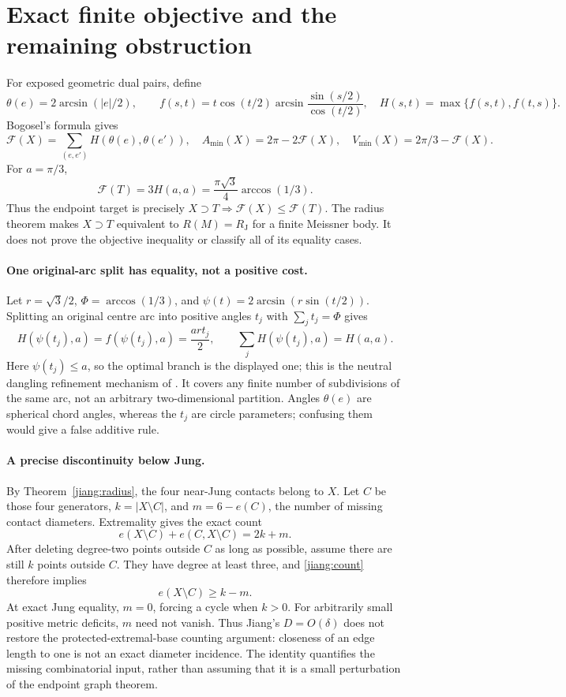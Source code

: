 \documentclass[11pt]{article}
\theoremstyle{remark}\newtheorem{remark}[theorem]{Remark}
\newcommand{\RJ}{R_{\mathrm J}}
\begin{document}
\section{Exact finite objective and the remaining obstruction}
For exposed geometric dual pairs, define
\[
 \theta(e)=2\arcsin(|e|/2),\qquad
 f(s,t)=t\cos(t/2)\arcsin\frac{\sin(s/2)}{\cos(t/2)},\quad
 H(s,t)=\max\{f(s,t),f(t,s)\}.
\]
Bogosel's formula \cite{BogoselVolume} gives
\[
 \mathcal F(X)=\sum_{(e,e')}H(\theta(e),\theta(e')),
 \quad A_{\min}(X)=2\pi-2\mathcal F(X),\quad
 V_{\min}(X)=2\pi/3-\mathcal F(X).
\]
For $a=\pi/3$,
\[
 \mathcal F(T)=3H(a,a)=\frac{\pi\sqrt3}{4}\arccos(1/3).
\]
Thus the endpoint target is precisely
$X\supset T\Rightarrow\mathcal F(X)\leq\mathcal F(T)$.
The radius theorem makes $X\supset T$ equivalent to $R(M)=\RJ$ for a
finite Meissner body. It does not prove the objective inequality or
classify all of its equality cases.

\paragraph{One original-arc split has equality, not a positive cost.}
Let $r=\sqrt3/2$, $\Phi=\arccos(1/3)$, and
$\psi(t)=2\arcsin(r\sin(t/2))$. Splitting an original centre arc into
positive angles $t_j$ with $\sum_j t_j=\Phi$ gives
\[
 H(\psi(t_j),a)=f(\psi(t_j),a)=\frac{ar t_j}{2},\qquad
 \sum_j H(\psi(t_j),a)=H(a,a).
\]
Here $\psi(t_j)\leq a$, so the optimal branch is the displayed one;
this is the neutral dangling refinement mechanism of \cite{BogoselDangling}.
It covers any finite number of subdivisions of the same arc, not an
arbitrary two-dimensional partition. Angles $\theta(e)$ are spherical
chord angles, whereas the $t_j$ are circle parameters; confusing them
would give a false additive rule.

\paragraph{A precise discontinuity below Jung.}
By Theorem~\ref{jiang:radius}, the four near-Jung contacts belong to $X$.
Let $C$ be those four generators, $k=|X\setminus C|$, and
$m=6-e(C)$, the number of missing contact diameters. Extremality gives
the exact count
\begin{equation}\label{jiang:count}
 e(X\setminus C)+e(C,X\setminus C)=2k+m.
\end{equation}
After deleting degree-two points outside $C$ as long as possible, assume
there are still $k$ points outside $C$. They have degree at least three,
and \eqref{jiang:count} therefore implies
\[
 e(X\setminus C)\geq k-m.
\]
At exact Jung equality, $m=0$, forcing a cycle when $k>0$.
For arbitrarily small positive metric deficits, $m$ need not vanish.
Thus Jiang's $D=O(\delta)$ does not restore the protected-extremal-base
counting argument: closeness of an edge length to one is not an exact
diameter incidence. The identity quantifies the missing combinatorial
input, rather than assuming that it is a small perturbation of the
endpoint graph theorem.
\end{document}
